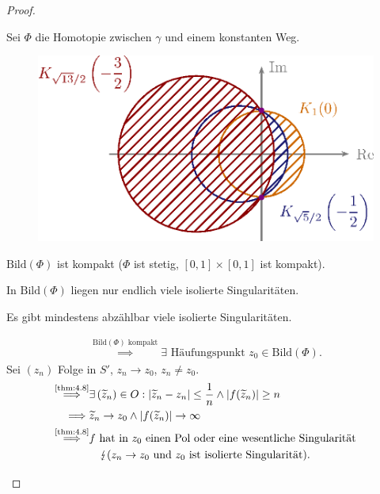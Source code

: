 \documentclass[a4paper,10pt]{scrbook}
\begin{document}
\begin{theorem}[Residuensatz]
\begin{proof}
\begin{enum-alph}
      \item \label{itm:4.15 b)} Sei $\Phi$ die Homotopie zwischen $\gamma$ und einem konstanten Weg.
      \begin{figure}[H]
        \centering
        \includegraphics[scale=0.2]{images/ana3-tmp-35}
      \end{figure}
      $\mathrm{Bild}(\Phi)$ ist kompakt ($\Phi$ ist stetig, $[0,1] \times [0,1]$ ist kompakt).
      \begin{notice*}[Behauptung:]
        In $\mathrm{Bild}(\Phi)$ liegen nur endlich viele isolierte Singularitäten.
      \end{notice*}
      \begin{notice*}[Annahme:]
        Es gibt mindestens abzählbar viele isolierte Singularitäten.
      \end{notice*}
      \begin{align*}
        \overset{\mathrm{Bild}(\Phi) \text{ kompakt}}{\implies} \exists \text{ Häufungspunkt } z_0 \in \mathrm{Bild}(\Phi) .
      \end{align*}
      Sei $(z_n)$ Folge in $S'$, $z_n \to z_0$, $z_n \neq z_0$.
      \begin{align*} %
        \overset{\text{\ref{thm:4.8}}}{\implies}& \exists \, (\widetilde{z}_n) \in O : |\widetilde{z}_n - z_n| \leq \frac{1}{n} \land |f(\widetilde{z}_n)| \geq n \\
        \implies& \widetilde{z}_n \to z_0 \land |f(\widetilde{z}_n)| \to \infty \\
        \overset{\text{\ref{thm:4.8}}}{\implies}& \text{$f$ hat in $z_0$ einen Pol oder eine wesentliche Singularität} \\
        & \quad \lightning (z_n \to z_0 \text{ und } z_0 \text{ ist isolierte Singularität}).
      \end{align*}


\end{enum-alph}
\end{proof}
\end{theorem}
\end{document}
